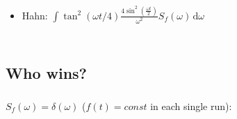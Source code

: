 \documentclass[aspectratio=169, 13pt, t]{beamer}
\newcommand{\diff}{\,\mathrm{d}}
\begin{document}
\begin{frame}[t]
\begin{columns}[c]
\vspace{0.1cm}
\begin{itemize}

\item Hahn: $\int \tan^2(\omega t/4) \frac{4 \sin^2(\frac{\omega t}{2})}{\omega^2} S_f(\omega)\diff \omega  $ 

\end{itemize}
\end{columns}

\end{frame}

\subsection{Who wins?}
\begin{frame}[t]\frametitle{\secname}\framesubtitle{\subsecname}
$S_f(\omega) = \delta(\omega)$ ($f(t) = const$ in each single run):
\end{frame}
\end{document}
